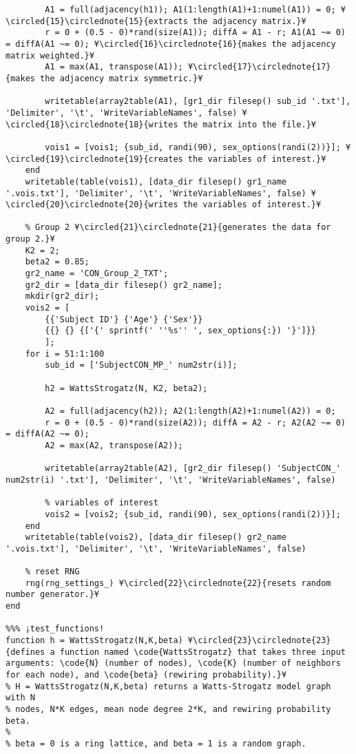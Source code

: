 \documentclass{tufte-handout}
\begin{document}
\begin{lstlisting}
        A1 = full(adjacency(h1)); A1(1:length(A1)+1:numel(A1)) = 0; ¥\circled{15}\circlednote{15}{extracts the adjacency matrix.}¥ 
        r = 0 + (0.5 - 0)*rand(size(A1)); diffA = A1 - r; A1(A1 ~= 0) = diffA(A1 ~= 0); ¥\circled{16}\circlednote{16}{makes the adjacency matrix weighted.}¥
        A1 = max(A1, transpose(A1)); ¥\circled{17}\circlednote{17}{makes the adjacency matrix symmetric.}¥

        writetable(array2table(A1), [gr1_dir filesep() sub_id '.txt'], 'Delimiter', '\t', 'WriteVariableNames', false) ¥\circled{18}\circlednote{18}{writes the matrix into the file.}¥

        vois1 = [vois1; {sub_id, randi(90), sex_options(randi(2))}]; ¥\circled{19}\circlednote{19}{creates the variables of interest.}¥
    end
    writetable(table(vois1), [data_dir filesep() gr1_name '.vois.txt'], 'Delimiter', '\t', 'WriteVariableNames', false) ¥\circled{20}\circlednote{20}{writes the variables of interest.}¥

    % Group 2 ¥\circled{21}\circlednote{21}{generates the data for group 2.}¥  
    K2 = 2; 
    beta2 = 0.85;
    gr2_name = 'CON_Group_2_TXT';
    gr2_dir = [data_dir filesep() gr2_name];
    mkdir(gr2_dir);
    vois2 = [
        {{'Subject ID'} {'Age'} {'Sex'}}
        {{} {} {['{' sprintf(' ''%s'' ', sex_options{:}) '}']}}
        ];
    for i = 51:1:100
        sub_id = ['SubjectCON_MP_' num2str(i)];

        h2 = WattsStrogatz(N, K2, beta2);

        A2 = full(adjacency(h2)); A2(1:length(A2)+1:numel(A2)) = 0;
        r = 0 + (0.5 - 0)*rand(size(A2)); diffA = A2 - r; A2(A2 ~= 0) = diffA(A2 ~= 0);
        A2 = max(A2, transpose(A2));

        writetable(array2table(A2), [gr2_dir filesep() 'SubjectCON_' num2str(i) '.txt'], 'Delimiter', '\t', 'WriteVariableNames', false)

        % variables of interest
        vois2 = [vois2; {sub_id, randi(90), sex_options(randi(2))}];
    end
    writetable(table(vois2), [data_dir filesep() gr2_name '.vois.txt'], 'Delimiter', '\t', 'WriteVariableNames', false)

    % reset RNG
    rng(rng_settings_) ¥\circled{22}\circlednote{22}{resets random number generator.}¥  
end

%%% ¡test_functions! 
function h = WattsStrogatz(N,K,beta) ¥\circled{23}\circlednote{23}{defines a function named \code{WattsStrogatz} that takes three input arguments: \code{N} (number of nodes), \code{K} (number of neighbors for each node), and \code{beta} (rewiring probability).}¥
% H = WattsStrogatz(N,K,beta) returns a Watts-Strogatz model graph with N
% nodes, N*K edges, mean node degree 2*K, and rewiring probability beta.
%
% beta = 0 is a ring lattice, and beta = 1 is a random graph.


\end{lstlisting}
\end{document}
